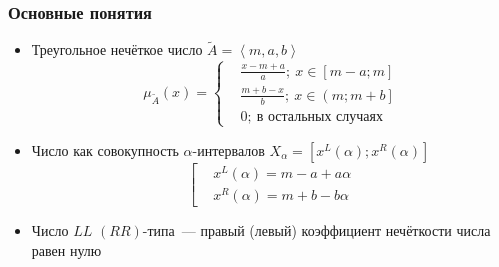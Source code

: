\documentclass[12pt]{beamer}
\begin{document}
\begin{frame}
  \frametitle{Основные понятия}
  \begin{itemize}
    \item Треугольное нечёткое число $\tilde A = \left\langle m,a,b \right\rangle $
      \begin{equation}
        \mu_{\tilde A}\left( x \right)=
        \left\{ \begin{aligned}
			& \frac{x-m+a}{a};\ x\in \left[ m-a;m \right] \\ 
			& \frac{m+b-x}{b};\ x\in \left( m;m+b \right] \\ 
			& 0;\ \text{в остальных случаях} 
	 	\end{aligned} \right.
      \end{equation}
    \item Число как совокупность $\alpha$-интервалов $X_\alpha = \left[x^L(\alpha); x^R(\alpha) \right]$
      \begin{equation}
        \left[ 
          \begin{aligned}
            & x^L(\alpha )=m-a+a\alpha  \\ 
            & x^R(\alpha )=m+b-b\alpha
          \end{aligned}
        \right.
      \end{equation}
    \item Число $LL$ $\left( RR \right)$-типа~--- правый (левый) коэффициент нечёткости числа равен нулю
  \end{itemize}
\end{frame}
\end{document}
